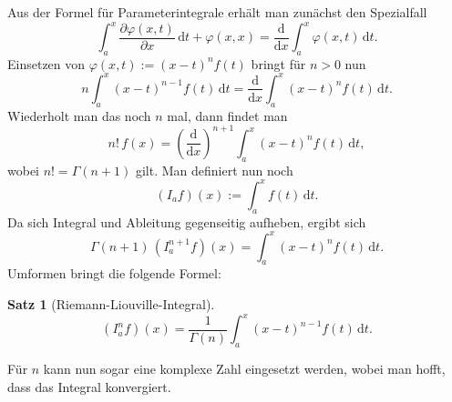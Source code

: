 \documentclass[a4paper,10pt,fleqn,twocolumn,twoside,dvipdfmx]{scrartcl}
\numberwithin{equation}{section}
\theoremstyle{rmbox}
\newtheorem{theorem}{Satz}
\begin{document}
Aus der Formel für Parameterintegrale erhält man
zunächst den Spezialfall%
\begin{equation}
\int_a^x \frac{\partial \varphi(x,t)}{\partial x}\,\mathrm dt+\varphi(x,x)
= \frac{\mathrm d}{\mathrm dx}\int_a^x \varphi(x,t)\,\mathrm dt.
\end{equation}
Einsetzen von $\varphi(x,t):=(x-t)^n f(t)$ bringt für $n>0$ nun
\begin{equation}
n\int_a^x (x-t)^{n-1}f(t)\,\mathrm dt
= \frac{\mathrm d}{\mathrm dx}\int_a^x (x-t)^n f(t)\,\mathrm dt.
\end{equation}
Wiederholt man das noch $n$ mal, dann findet man
\begin{equation}
n!\,f(x) =
\left(\frac{\mathrm d}{\mathrm dx}\right)^{n+1} \int_a^x (x-t)^n f(t)\,\mathrm dt,
\end{equation}
wobei $n!=\Gamma(n+1)$ gilt. Man definiert nun noch
\begin{equation}
(I_a f)(x) := \int_a^x f(t)\,\mathrm dt.
\end{equation}
Da sich Integral und Ableitung gegenseitig aufheben, ergibt sich
\begin{equation}
\Gamma(n+1)\, (I_a^{n+1}f)(x) = \int_a^x (x-t)^n f(t)\,\mathrm dt.
\end{equation}
Umformen bringt die folgende Formel:

\begin{theorem}[Riemann-Liouville-Integral]
\begin{equation}\label{eq:Riemann-Liouville-Integral}
(I_a^n f)(x) = \frac{1}{\Gamma(n)}\int_a^x (x-t)^{n-1}f(t)\,\mathrm dt.
\end{equation}
\end{theorem}
Für $n$ kann nun sogar eine komplexe Zahl eingesetzt werden, wobei
man hofft, dass das Integral konvergiert.

\end{document}
